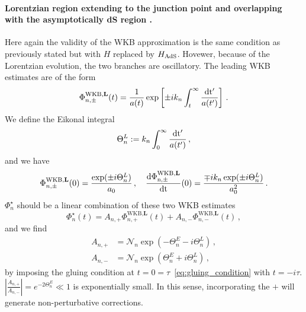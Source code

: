 \documentclass[a4paper,11pt]{article}
\begin{document}
\paragraph{Lorentzian region extending to the junction point and overlapping with the asymptotically dS region .}
Here again the validity of the WKB approximation is the same condition as previously stated but with $H$ replaced by $H_{\rm AdS}$. Hovewer, because of the Lorentzian evolution, the two branches are oscillatory. The leading WKB estimates are of the form
\begin{equation}\label{eq:WKB_Lorentzian}
    \Phi^{\text{WKB},\textbf{L}}_{n,\pm}(t) = \frac{1}{a(t)}\exp\left[\pm i k_n \int_{t}^{\infty}\frac{\rm{d}t'}{a(t')} \right]\,.
\end{equation}
We define the Eikonal integral
\begin{equation}
    \Theta^L_n :=k_n \int_{0}^{\infty}\frac{\rm{d}t'}{a(t')}\,,
\end{equation}
and we have 
\begin{equation}
    \Phi^{\text{WKB},\textbf{L}}_{n,\pm}(0) = \frac{\exp(\pm i \Theta^L_n)}{a_0}\,, \quad \frac{\rm{d}\Phi^{\text{WKB},\textbf{L}}_{n,\pm}}{\rm{d} t}(0)= \frac{\mp i k_n \exp(\pm i \Theta^L_n)}{a_0^{2}}\,.
\end{equation}
$\Phi_n^\star$ should be a linear combination of these two WKB estimates
\begin{equation}
    \Phi_n^\star(t) = A_{n,+} \Phi^{\text{WKB},\textbf{L}}_{n,+}(t) + A_{n,-} \Phi^{\text{WKB},\textbf{L}}_{n,-}(t)\,,
\end{equation}
and we find 
\begin{equation}
    \begin{aligned}
        A_{n,+} &= \mathcal{N}_n \exp(-\Theta_n^E-i\Theta_n^L)\,, \\
        A_{n,-} &= \mathcal{N}_n \exp(\Theta_n^E+i\Theta_n^L)\,,
    \end{aligned}
\end{equation}
by imposing the gluing condition at $t=0=\tau$~\eqref{eq:gluing_condition} with $t=-i\tau$. $\left|\frac{A_{n,+}}{A_{n,-}}\right| = e^{-2\Theta_n^E}\ll1$ is exponentially small. In this sense, incorporating the $+$ will generate non-perturbative corrections. 
\end{document}
